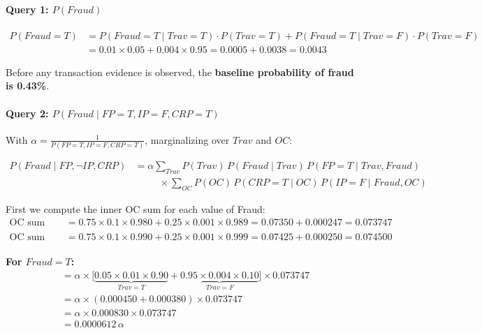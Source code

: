 \documentclass[12pt]{article}
\begin{document}
\paragraph{Query 1: $P(\textit{Fraud})$}

\begin{align*}
P(\textit{Fraud}{=}T)
  &=P(\textit{Fraud}{=}T\mid\textit{Trav}{=}T)\cdot P(\textit{Trav}{=}T)
   +P(\textit{Fraud}{=}T\mid\textit{Trav}{=}F)\cdot P(\textit{Trav}{=}F)\\
  &=0.01\times0.05+0.004\times0.95
   =0.0005+0.0038=\boxed{0.0043}
\end{align*}

Before any transaction evidence is observed, the \textbf{baseline probability of fraud is 0.43\%}.

\paragraph{Query 2: $P(\textit{Fraud}\mid\textit{FP}{=}T,\textit{IP}{=}F,\textit{CRP}{=}T)$}

With $\alpha=\tfrac{1}{P(\textit{FP}{=}T,\textit{IP}{=}F,\textit{CRP}{=}T)}$,
marginalizing over $\textit{Trav}$ and $\textit{OC}$:

\begin{align*}
P(\textit{Fraud}\mid\textit{FP},\neg\textit{IP},\textit{CRP})
&=\alpha\sum_{\textit{Trav}}P(\textit{Trav})\,P(\textit{Fraud}\mid\textit{Trav})\,
  P(\textit{FP}{=}T\mid\textit{Trav},\textit{Fraud})\\
&\hspace{30pt}\times
  \sum_{\textit{OC}}P(\textit{OC})\,P(\textit{CRP}{=}T\mid\textit{OC})\,
  P(\textit{IP}{=}F\mid\textit{Fraud},\textit{OC})
\end{align*}

First we compute the inner OC sum for each value of Fraud:
\begin{align*}
\text{OC sum (Fraud=T)}&=0.75\times0.1\times0.980+0.25\times0.001\times0.989
 =0.07350+0.000247=0.073747\\
\text{OC sum (Fraud=F)}&=0.75\times0.1\times0.990+0.25\times0.001\times0.999
 =0.07425+0.000250=0.074500
\end{align*}

\textbf{For $\textit{Fraud}=T$:}
\begin{align*}
&=\alpha\times\bigl[\underbrace{0.05\times0.01\times0.90}_{\textit{Trav}=T}
  +\underbrace{0.95\times0.004\times0.10}_{\textit{Trav}=F}\bigr]
  \times0.073747\\
&=\alpha\times(0.000450+0.000380)\times0.073747\\
&=\alpha\times0.000830\times0.073747\\
&=0.0000612\,\alpha
\end{align*}
\end{document}
